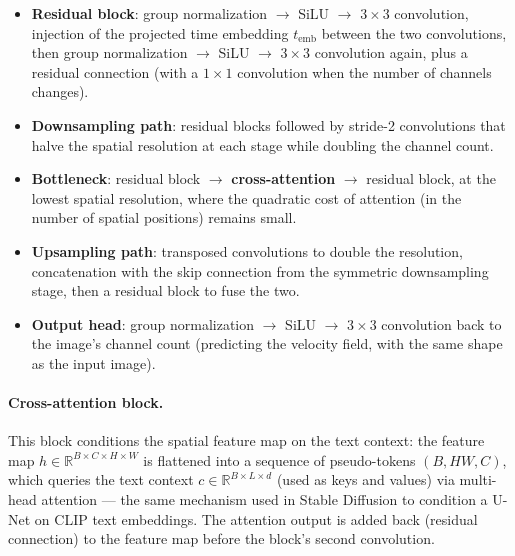 \documentclass[11pt,a4paper]{article}
\begin{document}
\begin{itemize}
  \item \textbf{Residual block}: group normalization $\to$ SiLU $\to$
        $3\times3$ convolution, injection of the projected time embedding
        $t_{\mathrm{emb}}$ between the two convolutions, then group
        normalization $\to$ SiLU $\to$ $3\times3$ convolution again, plus a
        residual connection (with a $1\times1$ convolution when the number
        of channels changes).
  \item \textbf{Downsampling path}: residual blocks followed by
        stride-2 convolutions that halve the spatial resolution at each
        stage while doubling the channel count.
  \item \textbf{Bottleneck}: residual block $\to$ \textbf{cross-attention}
        $\to$ residual block, at the lowest spatial resolution, where the
        quadratic cost of attention (in the number of spatial positions)
        remains small.
  \item \textbf{Upsampling path}: transposed convolutions to double the
        resolution, concatenation with the skip connection from the
        symmetric downsampling stage, then a residual block to fuse the
        two.
  \item \textbf{Output head}: group normalization $\to$ SiLU $\to$
        $3\times3$ convolution back to the image's channel count (predicting
        the velocity field, with the same shape as the input image).
\end{itemize}

\paragraph{Cross-attention block.} This block conditions the spatial feature
map on the text context: the feature map $h \in \mathbb{R}^{B\times C\times
H\times W}$ is flattened into a sequence of pseudo-tokens $(B, HW, C)$,
which queries the text context $c \in \mathbb{R}^{B\times L\times d}$
(used as keys and values) via multi-head attention — the same mechanism used
in Stable Diffusion to condition a U-Net on CLIP text embeddings. The
attention output is added back (residual connection) to the feature map
before the block's second convolution.
\end{document}
